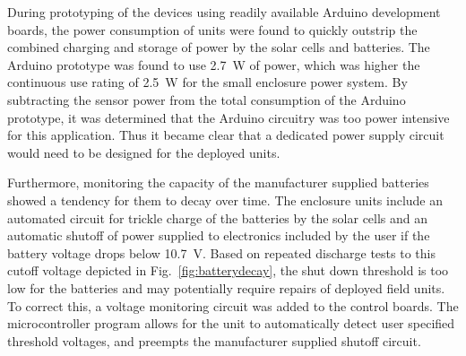 \documentclass[journal]{IEEEtran}
\begin{document}

During prototyping of the devices using readily available Arduino development boards, the power consumption of units were found to quickly outstrip the combined charging and storage of power by the solar cells and batteries.  The Arduino prototype was found to use \SI{2.7}{\watt} of power, which was higher the continuous use rating of \SI{2.5}{\watt} for the small enclosure power system.  By subtracting the sensor power from the total consumption of the Arduino prototype, it was determined that the Arduino circuitry was too power intensive for this application.  Thus it became clear that a dedicated power supply circuit would need to be designed for the deployed units.  

Furthermore, monitoring the capacity of the manufacturer supplied batteries showed a tendency for them to decay over time.  The enclosure units include an automated circuit for trickle charge of the batteries by the solar cells and an automatic shutoff of power supplied to electronics included by the user if the battery voltage drops below \SI{10.7}{\volt}.  Based on repeated discharge tests to this cutoff voltage depicted in Fig.~\ref{fig:batterydecay}, the shut down threshold is too low for the batteries and may potentially require repairs of deployed field units.  To correct this, a voltage monitoring circuit was added to the control boards.  The microcontroller program allows for the unit to automatically detect user specified threshold voltages, and preempts the manufacturer supplied shutoff circuit.  
\end{document}
